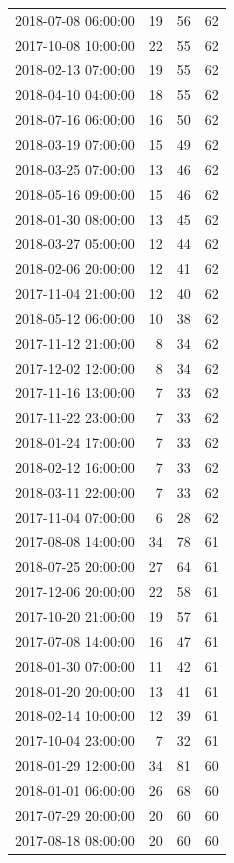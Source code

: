 \begin{tabular}{lrrr}
2018-07-08 06:00:00 & 19 & 56 & 62 \\
2017-10-08 10:00:00 & 22 & 55 & 62 \\
2018-02-13 07:00:00 & 19 & 55 & 62 \\
2018-04-10 04:00:00 & 18 & 55 & 62 \\
2018-07-16 06:00:00 & 16 & 50 & 62 \\
2018-03-19 07:00:00 & 15 & 49 & 62 \\
2018-03-25 07:00:00 & 13 & 46 & 62 \\
2018-05-16 09:00:00 & 15 & 46 & 62 \\
2018-01-30 08:00:00 & 13 & 45 & 62 \\
2018-03-27 05:00:00 & 12 & 44 & 62 \\
2018-02-06 20:00:00 & 12 & 41 & 62 \\
2017-11-04 21:00:00 & 12 & 40 & 62 \\
2018-05-12 06:00:00 & 10 & 38 & 62 \\
2017-11-12 21:00:00 & 8 & 34 & 62 \\
2017-12-02 12:00:00 & 8 & 34 & 62 \\
2017-11-16 13:00:00 & 7 & 33 & 62 \\
2017-11-22 23:00:00 & 7 & 33 & 62 \\
2018-01-24 17:00:00 & 7 & 33 & 62 \\
2018-02-12 16:00:00 & 7 & 33 & 62 \\
2018-03-11 22:00:00 & 7 & 33 & 62 \\
2017-11-04 07:00:00 & 6 & 28 & 62 \\
2017-08-08 14:00:00 & 34 & 78 & 61 \\
2018-07-25 20:00:00 & 27 & 64 & 61 \\
2017-12-06 20:00:00 & 22 & 58 & 61 \\
2017-10-20 21:00:00 & 19 & 57 & 61 \\
2017-07-08 14:00:00 & 16 & 47 & 61 \\
2018-01-30 07:00:00 & 11 & 42 & 61 \\
2018-01-20 20:00:00 & 13 & 41 & 61 \\
2018-02-14 10:00:00 & 12 & 39 & 61 \\
2017-10-04 23:00:00 & 7 & 32 & 61 \\
2018-01-29 12:00:00 & 34 & 81 & 60 \\
2018-01-01 06:00:00 & 26 & 68 & 60 \\
2017-07-29 20:00:00 & 20 & 60 & 60 \\
2017-08-18 08:00:00 & 20 & 60 & 60 \\

\end{tabular}
